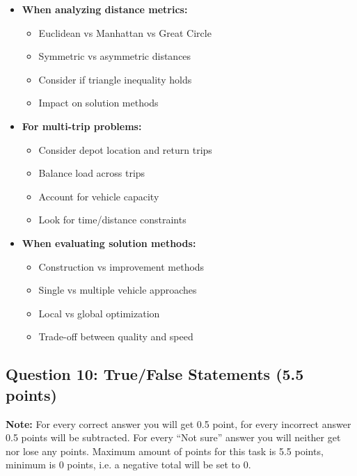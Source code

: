 \begin{enumerate}[label=\alph*)]
\begin{itemize}
\item \textbf{When analyzing distance metrics:}
  \begin{itemize}
  \item Euclidean vs Manhattan vs Great Circle
  \item Symmetric vs asymmetric distances
  \item Consider if triangle inequality holds
  \item Impact on solution methods
  \end{itemize}

\item \textbf{For multi-trip problems:}
  \begin{itemize}
  \item Consider depot location and return trips
  \item Balance load across trips
  \item Account for vehicle capacity
  \item Look for time/distance constraints
  \end{itemize}

\item \textbf{When evaluating solution methods:}
  \begin{itemize}
  \item Construction vs improvement methods
  \item Single vs multiple vehicle approaches
  \item Local vs global optimization
  \item Trade-off between quality and speed
  \end{itemize}
\end{itemize}
\end{enumerate}

\subsection{Question 10: True/False Statements (5.5 points)}
\textbf{Note:} For every correct answer you will get 0.5 point, for every incorrect answer 0.5 points will be subtracted. For every ``Not sure'' answer you will neither get nor lose any points. Maximum amount of points for this task is 5.5 points, minimum is 0 points, i.e. a negative total will be set to 0.

